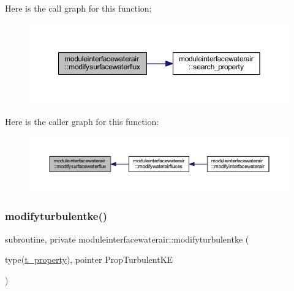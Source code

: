 Here is the call graph for this function\+:\nopagebreak
\begin{figure}[H]
\begin{center}
\leavevmode
\includegraphics[width=350pt]{namespacemoduleinterfacewaterair_a88a4ad4c4d7d19f977f8154341d169fd_cgraph}
\end{center}
\end{figure}
Here is the caller graph for this function\+:\nopagebreak
\begin{figure}[H]
\begin{center}
\leavevmode
\includegraphics[width=350pt]{namespacemoduleinterfacewaterair_a88a4ad4c4d7d19f977f8154341d169fd_icgraph}
\end{center}
\end{figure}
\mbox{\label{namespacemoduleinterfacewaterair_ac1f2af410795916d4c7572b0b5a8e963}} 
\subsubsection{\texorpdfstring{modifyturbulentke()}{modifyturbulentke()}}
{\footnotesize\ttfamily subroutine, private moduleinterfacewaterair\+::modifyturbulentke (\begin{DoxyParamCaption}\item[{type(\mbox{\hyperlink{structmoduleinterfacewaterair_1_1t__property}{t\+\_\+property}}), pointer}]{Prop\+Turbulent\+KE }\end{DoxyParamCaption})\hspace{0.3cm}{\ttfamily [private]}}

